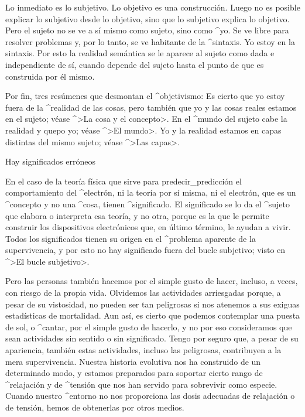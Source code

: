 Lo inmediato es lo subjetivo. Lo objetivo es una construcción. Luego no
es posible explicar lo subjetivo desde lo objetivo, sino que lo
subjetivo explica lo objetivo. Pero el sujeto no se ve a sí mismo como
sujeto, sino como ^{yo}. Se ve libre para resolver problemas y, por lo
tanto, se ve habitante de la ^{sintaxis}. Yo estoy en la sintaxis. Por
esto la realidad semántica se le aparece al sujeto como dada e
independiente de sí, cuando depende del sujeto hasta el punto de que es
construida por él mismo.

Por fin, tres resúmenes que desmontan el ^{objetivismo}:
\point Es cierto que yo estoy fuera de la ^{realidad} de las
cosas, pero también que yo y las cosas reales estamos en el sujeto;
 véase ^>La cosa y el concepto>.
\point En el ^{mundo} del sujeto cabe la realidad y quepo yo;
 véase ^>El mundo>.
\point Yo y la realidad estamos en capas distintas del mismo sujeto;
 véase ^>Las capas>.


\Section Hay significados erróneos

En el caso de la teoría física que sirve para predecir_{predicción} el
comportamiento del ^{electrón}, ni la teoría por sí misma, ni el
electrón, que es un ^{concepto} y no una ^{cosa}, tienen ^{significado}.
El significado se lo da el ^{sujeto} que elabora o interpreta esa
teoría, y no otra, porque es la que le permite construir los
dispositivos electrónicos que, en último término, le ayudan a vivir.
Todos los significados tienen su origen en el ^{problema aparente} de la
supervivencia, y por esto no hay significado fuera del bucle subjetivo;
visto en ^>El bucle subjetivo>.

Pero las personas también hacemos por el simple gusto de hacer, incluso,
a veces, con riesgo de la propia vida. Olvidemos las actividades
arriesgadas porque, a pesar de su vistosidad, no pueden ser tan
peligrosas si nos atenemos a sus exiguas estadísticas de mortalidad. Aun
así, es cierto que podemos contemplar una puesta de sol, o ^{cantar},
por el simple gusto de hacerlo, y no por eso consideramos que sean
actividades sin sentido o sin significado. Tengo por seguro que, a pesar
de su apariencia, también estas actividades, incluso las peligrosas,
contribuyen a la mera supervivencia. Nuestra historia evolutiva nos ha
construido de un determinado modo, y estamos preparados para soportar
cierto rango de ^{relajación} y de ^{tensión} que nos han servido para
sobrevivir como especie. Cuando nuestro ^{entorno} no nos proporciona
las dosis adecuadas de relajación o de tensión, hemos de obtenerlas por
otros medios.

